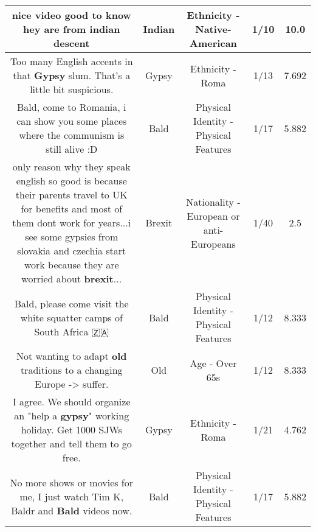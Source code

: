 \documentclass[11pt]{article}
\newlength\mylength
\begin{document}
\begin{center}
\begin{longtable}{|C{.65\mylength}|C{.30\mylength}|C{.12\mylength}|C{.12\mylength}|C{.12\mylength}|}
  \small nice video good to know hey are from \textbf{indian} descent\normalsize   & Indian & Ethnicity - Native-American & 1/10 & 10.0 \\  \hline
  \small Too many English accents in that \textbf{Gypsy} slum. That's a little bit suspicious.\normalsize   & Gypsy & Ethnicity - Roma & 1/13 & 7.692 \\  \hline
  \small Bald, come to Romania, i can show you some places where the communism is still alive :D\normalsize   & Bald & Physical Identity - Physical Features & 1/17 & 5.882 \\  \hline
  \small only reason why they speak english so good is because their parents travel to UK for benefits and most of them dont work for years...i see some gypsies from slovakia and czechia start work because they are worried about \textbf{brexit}...\normalsize   & Brexit & Nationality - European or anti-Europeans & 1/40 & 2.5 \\  \hline
  \small Bald, please come visit the white squatter camps of South Africa 🇿🇦\normalsize   & Bald & Physical Identity - Physical Features & 1/12 & 8.333 \\  \hline
  \small Not wanting to adapt \textbf{old} traditions to a changing Europe -> suffer.\normalsize   & Old & Age - Over 65s & 1/12 & 8.333 \\  \hline
  \small I agree. We should organize an "help a \textbf{gypsy}" working holiday. Get 1000 SJWs together and tell them to go free.\normalsize   & Gypsy & Ethnicity - Roma & 1/21 & 4.762 \\  \hline
  \small No more shows or movies for me, I just watch Tim K, Baldr and \textbf{Bald} videos now.\normalsize   & Bald & Physical Identity - Physical Features & 1/17 & 5.882 \\  \hline

\end{longtable}
\end{center}
\end{document}
